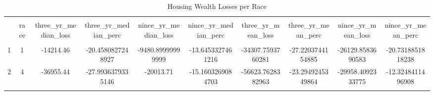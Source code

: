 
\begin{table}[!htbp] \centering 
  \caption{Housing Wealth Losses per Race} 
  \label{} 
\begin{tabular}{@{\extracolsep{5pt}} cccccccccc} 
\\[-1.8ex]\hline 
\hline \\[-1.8ex] 
 & race & three\_yr\_median\_loss & three\_yr\_median\_perc & nince\_yr\_median\_loss & nince\_yr\_median\_perc & three\_yr\_mean\_loss & three\_yr\_mean\_perc & nince\_yr\_mean\_loss & nince\_yr\_mean\_perc \\ 
\hline \\[-1.8ex] 
1 & 1 & -14214.46 & -20.4580827248927 & -9480.89999999999 & -13.6453327461216 & -34307.7593760281 & -27.2203744154885 & -26129.8583690583 & -20.7318851818238 \\ 
2 & 4 & -36955.44 & -27.9936379335146 & -20013.71 & -15.1603269084703 & -56623.7628382963 & -23.2949245349864 & -29958.4092333775 & -12.3248411496908 \\ 
\hline \\[-1.8ex] 
\end{tabular} 
\end{table} 
